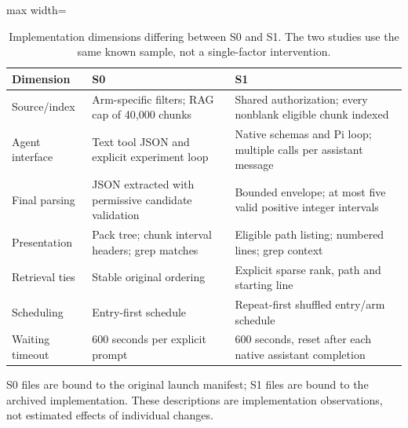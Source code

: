 \begin{table}[t]
\centering
\caption{Implementation dimensions differing between S0 and S1. The two studies use the same known sample, not a single-factor intervention.}\label{tab:configuration-changes}
\small
\begin{adjustbox}{max width=\textwidth}\begin{tabular}{p{}p{}p{}}
\toprule
Dimension & S0 & S1 \\
\midrule
Source/index & Arm-specific filters; RAG cap of 40,000 chunks & Shared authorization; every nonblank eligible chunk indexed \\
Agent interface & Text tool JSON and explicit experiment loop & Native schemas and Pi loop; multiple calls per assistant message \\
Final parsing & JSON extracted with permissive candidate validation & Bounded envelope; at most five valid positive integer intervals \\
Presentation & Pack tree; chunk interval headers; grep matches & Eligible path listing; numbered lines; grep context \\
Retrieval ties & Stable original ordering & Explicit sparse rank, path and starting line \\
Scheduling & Entry-first schedule & Repeat-first shuffled entry/arm schedule \\
Waiting timeout & 600 seconds per explicit prompt & 600 seconds, reset after each native assistant completion \\
\bottomrule
\end{tabular}\end{adjustbox}
\par\vspace{3pt}\begin{minipage}{\textwidth}\footnotesize S0 files are bound to the original launch manifest; S1 files are bound to the archived implementation. These descriptions are implementation observations, not estimated effects of individual changes.\end{minipage}
\end{table}
